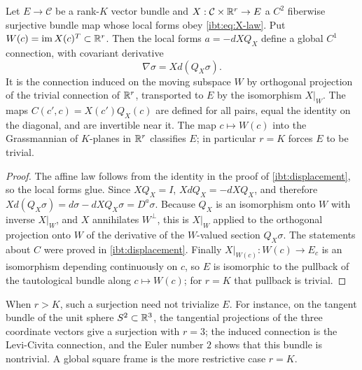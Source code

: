 Let $E\to\mathcal C$ be a rank-$K$ vector bundle and $X:\mathcal C\times\mathbb R^r\to E$ a $C^2$ fiberwise surjective bundle map whose local forms obey \cref{ibt:eq:X-law}. Put $W(c)=\operatorname{im}X(c)^T\subset\mathbb R^r$. Then the local forms $a=-dXQ_X$ define a global $C^1$ connection, with covariant derivative
\begin{equation}
 \nabla\sigma=Xd(Q_X\sigma).
 \label{ibt:eq:global-nabla}
\end{equation}
It is the connection induced on the moving subspace $W$ by orthogonal projection of the trivial connection of $\mathbb R^r$, transported to $E$ by the isomorphism $X|_W$. The maps $C(c',c)=X(c')Q_X(c)$ are defined for all pairs, equal the identity on the diagonal, and are invertible near it. The map $c\mapsto W(c)$ into the Grassmannian of $K$-planes in $\mathbb R^r$ classifies $E$; in particular $r=K$ forces $E$ to be trivial.
\begin{proof}
The affine law follows from the identity in the proof of \cref{ibt:displacement}, so the local forms glue. Since $XQ_X=I$, $XdQ_X=-dXQ_X$, and therefore $Xd(Q_X\sigma)=d\sigma-dXQ_X\sigma=D^a\sigma$. Because $Q_X$ is an isomorphism onto $W$ with inverse $X|_W$, and $X$ annihilates $W^\perp$, this is $X|_W$ applied to the orthogonal projection onto $W$ of the derivative of the $W$-valued section $Q_X\sigma$. The statements about $C$ were proved in \cref{ibt:displacement}. Finally $X|_{W(c)}:W(c)\to E_c$ is an isomorphism depending continuously on $c$, so $E$ is isomorphic to the pullback of the tautological bundle along $c\mapsto W(c)$; for $r=K$ that pullback is trivial.
\end{proof}

When $r>K$, such a surjection need not trivialize $E$. For instance, on the tangent bundle of the unit sphere $S^2\subset\mathbb R^3$, the tangential projections of the three coordinate vectors give a surjection with $r=3$; the induced connection is the Levi-Civita connection, and the Euler number $2$ shows that this bundle is nontrivial. A global square frame is the more restrictive case $r=K$.

